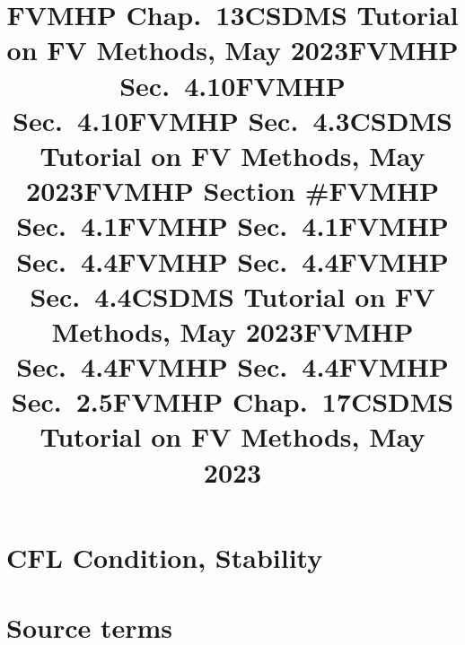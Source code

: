 \documentclass{beamer}
\newcommand{\mkslide}[1]{\title{CSDMS Tutorial on FV Methods, May 2023}
   }
\newcommand{\mkslidelabel}[2]{\title{#2}}
\begin{document}
\mkslidelabel{fvm/swrpseq.be}{FVMHP Chap.\ 13}
\mkslide{csdms2023/swrpxt2a.be}

\mkslidelabel{fvm/godview1.be}{FVMHP Sec.\ 4.10}
\mkslidelabel{fvm/godview1a.be}{FVMHP Sec.\ 4.10}



\mkslidelabel{fvm/consistency.be}{FVMHP Sec.\ 4.3}


\mkslide{csdms2023/part2.be}
\mkslidelabel{csdms2023/links.be}{FVMHP Section \#}



\section{CFL Condition, Stability}
\mkslidelabel{fvm/fundthm.be}{FVMHP Sec.\ 4.1}
\mkslidelabel{fvm/upwindstable1.be}{FVMHP Sec.\ 4.1}
\mkslidelabel{fvm/cfldt.be}{FVMHP Sec.\ 4.4}
\mkslidelabel{fvm/doddt.be}{FVMHP Sec.\ 4.4}
\mkslidelabel{fvm/dodchardt.be}{FVMHP Sec.\ 4.4}
\mkslide{csdms2023/centerdiffdtu.be}
\mkslidelabel{fvm/stencilsdt.be}{FVMHP Sec.\ 4.4}
\mkslidelabel{fvm/dodheat.be}{FVMHP Sec.\ 4.4}


\section{Source terms}

\mkslidelabel{csdms2023/src1b.be}{FVMHP Sec.\ 2.5}
\mkslidelabel{csdms2023/srcsplit1.be}{FVMHP Chap.\ 17}
\mkslide{csdms2023/swsources1.be}
\end{document}

